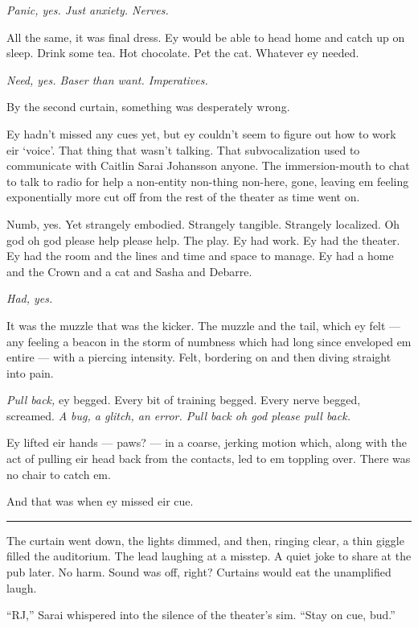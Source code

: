 \emph{Panic, yes. Just anxiety. Nerves.}

All the same, it was final dress. Ey would be able to head home and catch up on sleep. Drink some tea. Hot chocolate. Pet the cat. Whatever ey needed.

\emph{Need, yes. Baser than want. Imperatives.}

By the second curtain, something was desperately wrong.

Ey hadn't missed any cues yet, but ey couldn't seem to figure out how to work eir `voice'. That thing that wasn't talking. That subvocalization used to communicate with Caitlin Sarai Johansson anyone. The immersion-mouth to chat to talk to radio for help a non-entity non-thing non-here, gone, leaving em feeling exponentially more cut off from the rest of the theater as time went on.

Numb, yes. Yet strangely embodied. Strangely tangible. Strangely localized. Oh god oh god please help please help. The play. Ey had work. Ey had the theater. Ey had the room and the lines and time and space to manage. Ey had a home and the Crown and a cat and Sasha and Debarre.

\emph{Had, yes.}

It was the muzzle that was the kicker. The muzzle and the tail, which ey felt — any feeling a beacon in the storm of numbness which had long since enveloped em entire — with a piercing intensity. Felt, bordering on and then diving straight into pain.

\emph{Pull back,} ey begged. Every bit of training begged. Every nerve begged, screamed. \emph{A bug, a glitch, an error. Pull back oh god please pull back.}

Ey lifted eir hands — paws? — in a coarse, jerking motion which, along with the act of pulling eir head back from the contacts, led to em toppling over. There was no chair to catch em.

And that was when ey missed eir cue.

\begin{center}\rule{0.5\linewidth}{0.5pt}\end{center}

The curtain went down, the lights dimmed, and then, ringing clear, a thin giggle filled the auditorium. The lead laughing at a misstep. A quiet joke to share at the pub later. No harm. Sound was off, right? Curtains would eat the unamplified laugh.

``RJ,'' Sarai whispered into the silence of the theater's sim. ``Stay on cue, bud.''


